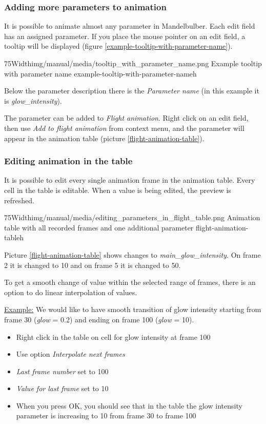 	\subsubsection{Adding more parameters to animation}
	
	It is possible to animate almost any parameter in Mandelbulber. Each edit field has an assigned parameter. If you place the mouse pointer on an edit field, a tooltip will be displayed (figure \ref{example-tooltip-with-parameter-name}).
	
	\simpleImageWithCaption75Width{img/manual/media/tooltip_with_parameter_name.png}
	{Example tooltip with parameter name}
	{example-tooltip-with-parameter-name}{h}
		
	Below the parameter description there is the \emph{Parameter name} (in this example it is \emph{glow\_intensity}).
	
	The parameter can be added to \emph{Flight animation}. Right click on an edit field, then use \emph{Add to flight animation} from context menu, and the parameter will appear in the animation table  (picture \ref{flight-animation-table}).
			
	\subsubsection{Editing animation in the table}
	
	It is possible to edit every single animation frame in the animation table. Every cell in the table is editable.  When a value is being edited, the preview is refreshed.
	
		\simpleImageWithCaption75Width{img/manual/media/editing_parameters_in_flight_table.png}
	{Animation table with all recorded frames and one additional parameter}
	{flight-animation-table}{h}
	
	Picture \ref{flight-animation-table} shows changes to \emph{main\_glow\_intensity}. On frame 2 it is changed to 10 and on frame 5 it is changed to 50.
	
	To get a smooth change of value within the selected range of frames, there is an option to do linear interpolation of values. 
	
	\underline{Example:} We would like to have smooth transition of glow intensity starting from frame 30 (\emph{glow} = 0.2) and ending on frame 100 (\emph{glow} = 10).
	\begin{itemize}
		\item Right click in the table on cell for glow intensity at frame 100
		\item Use option  \emph{Interpolate next frames}
		\item \emph{Last frame number} set to 100
		\item \emph{Value for last frame} set to 10
		\item When you press OK, you should see that in the table the glow intensity parameter is increasing to 10 from frame 30 to frame 100
	\end{itemize} 
	

